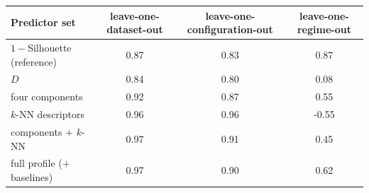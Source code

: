 \begin{tabular}{@{}lccc@{}}
\toprule
Predictor set & leave-one-dataset-out & leave-one-configuration-out & leave-one-regime-out \\
\midrule
$1-$Silhouette (reference) & 0.87 & 0.83 & 0.87 \\
$D$ & 0.84 & 0.80 & 0.08 \\
four components & 0.92 & 0.87 & 0.55 \\
$k$-NN descriptors & 0.96 & 0.96 & -0.55 \\
components $+$ $k$-NN & 0.97 & 0.91 & 0.45 \\
full profile ($+$ baselines) & 0.97 & 0.90 & 0.62 \\
\bottomrule
\end{tabular}
